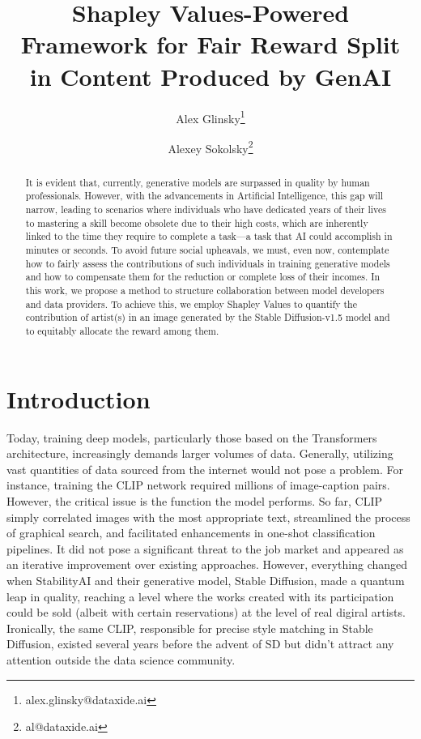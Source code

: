 \documentclass[12pt, letterpaper]{article}
\title{Shapley Values-Powered Framework for Fair Reward Split in Content Produced by GenAI}
\author[1]{Alex Glinsky\thanks{alex.glinsky@dataxide.ai}}
\author[1]{Alexey Sokolsky\thanks{al@dataxide.ai}}
\affil[1]{Dataxide.ai}
\date{}
\begin{document}
\maketitle

\begin{abstract}
It is evident that, currently, generative models are surpassed in quality by human professionals. However, with the advancements in Artificial Intelligence, this gap will narrow, leading to scenarios where individuals who have dedicated years of their lives to mastering a skill become obsolete due to their high costs, which are inherently linked to the time they require to complete a task—a task that AI could accomplish in minutes or seconds. To avoid future social upheavals, we must, even now, contemplate how to fairly assess the contributions of such individuals in training generative models and how to compensate them for the reduction or complete loss of their incomes. In this work, we propose a method to structure collaboration between model developers and data providers. To achieve this, we employ Shapley Values to quantify the contribution of artist(s) in an image generated by the Stable Diffusion-v1.5 model and to equitably allocate the reward among them.
\end{abstract}

\section{Introduction}
Today, training deep models, particularly those based on the Transformers \cite{vaswani2023attention} architecture, increasingly demands larger volumes of data. Generally, utilizing vast quantities of data sourced from the internet would not pose a problem. For instance, training the CLIP network required millions of image-caption pairs. However, the critical issue is the function the model performs. So far, CLIP simply correlated images with the most appropriate text, streamlined the process of graphical search, and facilitated enhancements in one-shot classification pipelines. It did not pose a significant threat to the job market and appeared as an iterative improvement over existing approaches. However, everything changed when StabilityAI and their generative model, Stable Diffusion, made a quantum leap in quality, reaching a level where the works created with its participation could be sold (albeit with certain reservations) at the level of real digiral artists. Ironically, the same CLIP, responsible for precise style matching in Stable Diffusion, existed several years before the advent of SD but didn't attract any attention outside the data science community.
\end{document}
